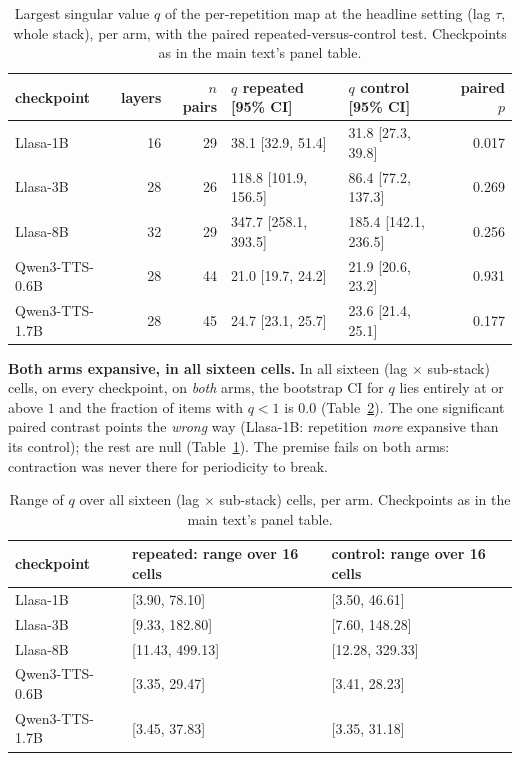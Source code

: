 \begin{table}[tp]
\centering
\caption{Largest singular value $q$ of the per-repetition map at the
headline setting (lag $\tau$, whole stack), per arm, with the paired
repeated-versus-control test. Checkpoints as in
the main text's panel table.}
\label{tab:qpanel}
\small
\begin{tabular}{@{}lrrp{2.8cm}p{2.8cm}r@{}}
\toprule
checkpoint & layers & $n$ pairs & $q$ repeated [95\% CI] & $q$ control [95\% CI] & paired $p$ \\
\midrule
Llasa-1B & 16 & 29 & 38.1 [32.9, 51.4] & 31.8 [27.3, 39.8] & 0.017 \\
Llasa-3B & 28 & 26 & 118.8 [101.9, 156.5] & 86.4 [77.2, 137.3] & 0.269 \\
Llasa-8B & 32 & 29 & 347.7 [258.1, 393.5] & 185.4 [142.1, 236.5] & 0.256 \\
Qwen3-TTS-0.6B & 28 & 44 & 21.0 [19.7, 24.2] & 21.9 [20.6, 23.2] & 0.931 \\
Qwen3-TTS-1.7B & 28 & 45 & 24.7 [23.1, 25.7] & 23.6 [21.4, 25.1] & 0.177 \\
\bottomrule
\end{tabular}
\end{table}

\noindent\textbf{Both arms expansive, in all sixteen cells.} In all
sixteen (lag $\times$ sub-stack) cells, on every checkpoint, on
\emph{both} arms, the bootstrap CI for $q$ lies entirely at or above
$1$ and the fraction of items with $q < 1$ is $0.0$
(Table~\ref{tab:qcells}). The one significant paired contrast points the \emph{wrong} way
(Llasa-1B: repetition \emph{more} expansive than its control); the rest
are null (Table~\ref{tab:qpanel}). The premise fails on both arms:
contraction was never there for periodicity to break.

\begin{table}[tp]
\centering
\caption{Range of $q$ over all sixteen (lag $\times$ sub-stack) cells,
per arm. Checkpoints as in the main text's panel table.}
\label{tab:qcells}
\small
\begin{tabular}{@{}lp{3.6cm}p{3.6cm}@{}}
\toprule
checkpoint & repeated: range over 16 cells & control: range over 16 cells \\
\midrule
Llasa-1B & [3.90, 78.10] & [3.50, 46.61] \\
Llasa-3B & [9.33, 182.80] & [7.60, 148.28] \\
Llasa-8B & [11.43, 499.13] & [12.28, 329.33] \\
Qwen3-TTS-0.6B & [3.35, 29.47] & [3.41, 28.23] \\
Qwen3-TTS-1.7B & [3.45, 37.83] & [3.35, 31.18] \\
\bottomrule
\end{tabular}
\end{table}

